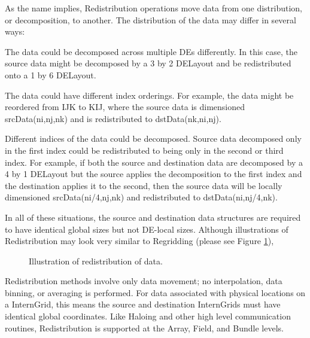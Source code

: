

As the name implies, Redistribution operations move data from one distribution,
or decomposition, to another.  The distribution of the data may differ in several 
ways:
 \begin{description}

  \item The data could be decomposed across multiple DEs differently.  In this
        case, the source data might be decomposed by a 3 by 2 DELayout and be
        redistributed onto a 1 by 6 DELayout.

  \item The data could have different index orderings.  For example, the data
        might be reordered from IJK to KIJ, where the source data is
        dimensioned srcData(ni,nj,nk) and is redistributed to dstData(nk,ni,nj).

  \item Different indices of the data could be decomposed.  Source data
        decomposed only in the first index could be redistributed to being
        only in the second or third index.  For example, if both the source
        and destination data are decomposed by a 4 by 1 DELayout but the source
        applies the decomposition to the first index and the destination
        applies it to the second, then the source data will be locally
        dimensioned srcData(ni/4,nj,nk) and redistributed to dstData(ni,nj/4,nk).

 \end{description}

In all of these situations, the source and destination data structures are
required to have identical global sizes but not DE-local sizes.  Although
illustrations of Redistribution may look very similar to Regridding (please
see Figure \ref{fig:Redist}),

\begin{center}
\begin{figure}
\label{fig:Redist}
\caption{Illustration of redistribution of data. }
\end{figure}
\end{center}

Redistribution methods involve only data movement; no interpolation, data
binning, or averaging is performed.  For data associated with physical locations
on a InternGrid, this means the source and destination InternGrids must have identical
global coordinates.  Like Haloing and other high level communication routines,
Redistribution is supported at the Array, Field, and Bundle levels. 

